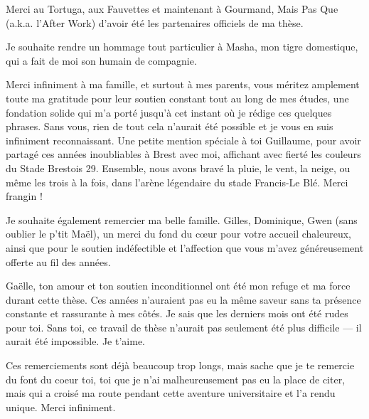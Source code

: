\begin{refsection}
Merci au Tortuga, aux Fauvettes et maintenant à Gourmand, Mais Pas Que
(a.k.a. l'After Work) d'avoir été les partenaires officiels de ma thèse.

Je souhaite rendre un hommage tout particulier à Masha, mon tigre
domestique, qui a fait de moi son humain de compagnie.

Merci infiniment à ma famille, et surtout à mes parents, vous méritez
amplement toute ma gratitude pour leur soutien constant tout au long de
mes études, une fondation solide qui m'a porté jusqu'à cet instant où je
rédige ces quelques phrases. Sans vous, rien de tout cela n'aurait été
possible et je vous en suis infiniment reconnaissant. Une petite mention
spéciale à toi Guillaume, pour avoir partagé ces années inoubliables à
Brest avec moi, affichant avec fierté les couleurs du Stade Brestois 29.
Ensemble, nous avons bravé la pluie, le vent, la neige, ou même les
trois à la fois, dans l'arène légendaire du stade Francis-Le Blé. Merci
frangin !

Je souhaite également remercier ma belle famille. Gilles, Dominique,
Gwen (sans oublier le p'tit Maël), un merci du fond du cœur pour votre
accueil chaleureux, ainsi que pour le soutien indéfectible et
l'affection que vous m'avez généreusement offerte au fil des années.

Gaëlle, ton amour et ton soutien inconditionnel ont été mon refuge et ma
force durant cette thèse. Ces années n'auraient pas eu la même saveur
sans ta présence constante et rassurante à mes côtés. Je sais que les
derniers mois ont été rudes pour toi. Sans toi, ce travail de thèse
n'aurait pas seulement été plus difficile --- il aurait été impossible.
Je t'aime.

Ces remerciements sont déjà beaucoup trop longs, mais sache que je te
remercie du font du coeur toi, toi que je n'ai malheureusement pas eu la
place de citer, mais qui a croisé ma route pendant cette aventure
universitaire et l'a rendu unique. Merci infiniment.

\printbibliography[heading=subbibintoc, title={Bibliographie}]
\end{refsection}
